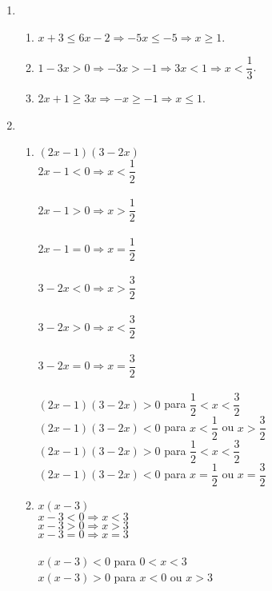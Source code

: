 \documentclass[10pt]{book}
\begin{document}
\begin{enumerate}
	\setcounter{enumi}{0}
	\item
		\begin{enumerate}\addtocounter{enumii}{3}
		\item
			$x + 3 \leq 6x - 2 \Rightarrow -5x \leq -5 \Rightarrow x \geq 1$.
		\item
			$1 - 3x > 0 \Rightarrow -3x > -1 \Rightarrow 3x < 1 \Rightarrow x < \dfrac{1}{3}$.
		\item
		$2x + 1 \geq 3x \Rightarrow -x \geq -1 \Rightarrow x \leq 1$.
		\end{enumerate}
	\item
		\begin{enumerate}\addtocounter{enumii}{8}
		\item
		$(2x - 1)(3 - 2x)$\\
		$2x - 1 < 0 \Rightarrow x < \dfrac{1}{2}$\\\\
		$2x - 1 > 0 \Rightarrow x > \dfrac{1}{2}$\\\\
		$2x - 1 = 0 \Rightarrow x = \dfrac{1}{2}$\\\\
		$3 - 2x < 0 \Rightarrow x > \dfrac{3}{2}$\\\\
		$3 - 2x > 0 \Rightarrow x < \dfrac{3}{2}$\\\\
		$3 - 2x = 0 \Rightarrow x = \dfrac{3}{2}$\\\\
		$(2x - 1)(3 - 2x) > 0$ para $\dfrac{1}{2} < x < \dfrac{3}{2}$\\
		$(2x - 1)(3 - 2x) < 0$ para $x < \dfrac{1}{2} $ ou $x > \dfrac{3}{2}$\\
		$(2x - 1)(3 - 2x) > 0$ para $\dfrac{1}{2} < x < \dfrac{3}{2}$\\
		$(2x - 1)(3 - 2x) < 0$ para $x = \dfrac{1}{2}$ ou $x = \dfrac{3}{2}$
		\item
		$x(x - 3)$\\
		$x - 3 < 0 \Rightarrow x < 3$ \\
		$x - 3 > 0 \Rightarrow x > 3$ \\
		$x - 3 = 0 \Rightarrow x = 3$ \\
		\\
		$x(x - 3) < 0$ para $0 < x < 3$\\
		$x(x - 3) > 0$ para $x < 0$ ou $x > 3$\\

\end{enumerate}
\end{enumerate}
\end{document}
